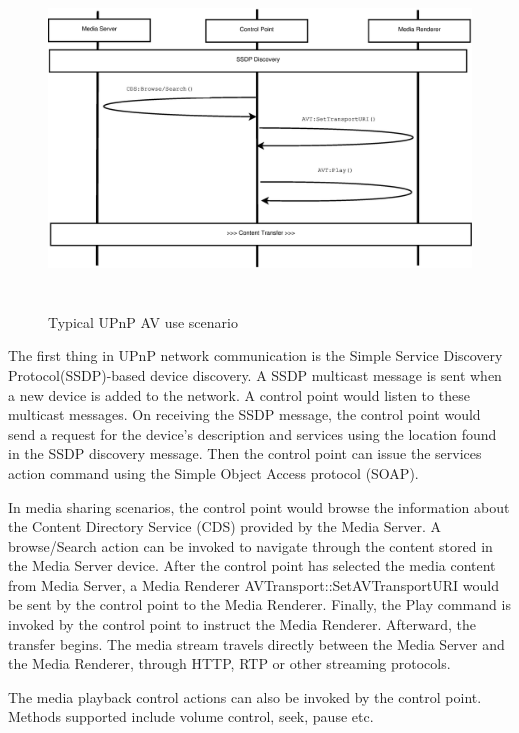 \begin{figure}[htb] 
\centering \includegraphics[height=9cm]{charts/chart1} 
\caption{Typical UPnP AV use scenario \label{chart1}} 
\end{figure} 

The first thing in UPnP network communication is the Simple Service Discovery 
Protocol(SSDP)-based device discovery. A SSDP multicast message is sent when a 
new device is added to the network. A control point would listen to these 
multicast messages. On receiving the SSDP message, the control point would send a request for the device's description and services using the location found in the SSDP discovery message. Then the control point can issue the services action command using the Simple Object Access protocol (SOAP). 

In media sharing scenarios, the control point would browse the information about 
the Content Directory Service (CDS) provided by the Media Server. A 
browse/Search action can be invoked to navigate through the content stored in 
the Media Server device. After the control point has selected the media content from 
Media Server, a Media Renderer AVTransport::SetAVTransportURI would be sent by 
the control point to the Media Renderer. Finally, the Play command is invoked by 
the control point to instruct the Media Renderer. Afterward, the transfer begins. The media 
stream travels directly between the Media Server and the Media Renderer, through HTTP, 
RTP or other streaming protocols. 

The media playback control actions can also be invoked by the control point. Methods 
supported include volume control, seek, pause etc. 

